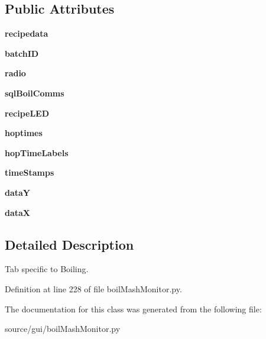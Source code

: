 \subsection*{Public Attributes}
\begin{DoxyCompactItemize}
\item 
\mbox{\label{classboil_mash_monitor_1_1_tab_boil_a92ca0ca467aab4e566fe161e08d67374}} 
{\bfseries recipedata}
\item 
\mbox{\label{classboil_mash_monitor_1_1_tab_boil_a4e7f36a6bf5ffdfb1403e29ad0b8ee97}} 
{\bfseries batch\+ID}
\item 
\mbox{\label{classboil_mash_monitor_1_1_tab_boil_a3c46d41c03dc849d878c6195e6a83a91}} 
{\bfseries radio}
\item 
\mbox{\label{classboil_mash_monitor_1_1_tab_boil_a1e5adf2b5a844193ee28d06bf84c7b59}} 
{\bfseries sql\+Boil\+Comms}
\item 
\mbox{\label{classboil_mash_monitor_1_1_tab_boil_a0c664668587397cbe28d3723d6c7225b}} 
{\bfseries recipe\+L\+ED}
\item 
\mbox{\label{classboil_mash_monitor_1_1_tab_boil_afe781eb097b4367e94724697060b45d8}} 
{\bfseries hoptimes}
\item 
\mbox{\label{classboil_mash_monitor_1_1_tab_boil_af26e32e39c989f72983b4ab431a42633}} 
{\bfseries hop\+Time\+Labels}
\item 
\mbox{\label{classboil_mash_monitor_1_1_tab_boil_ac719f7a1bf3614adee89a622496e13df}} 
{\bfseries time\+Stamps}
\item 
\mbox{\label{classboil_mash_monitor_1_1_tab_boil_ae295441cb116d7b5437457c1094af5e5}} 
{\bfseries dataY}
\item 
\mbox{\label{classboil_mash_monitor_1_1_tab_boil_abcf2b277c85c915d6a12f81fe3b2b202}} 
{\bfseries dataX}
\end{DoxyCompactItemize}


\subsection{Detailed Description}
Tab specific to Boiling. 

Definition at line 228 of file boil\+Mash\+Monitor.\+py.



The documentation for this class was generated from the following file\+:\begin{DoxyCompactItemize}
\item 
source/gui/boil\+Mash\+Monitor.\+py\end{DoxyCompactItemize}
